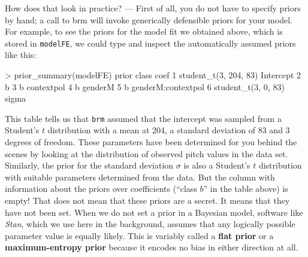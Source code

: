 \documentclass[nobib]{tufte-handout}
\begin{document}
How does that look in practice? --- First of all, you do not have to specify priors by hand; a call to \textrm{brm} will invoke generically defensible priors for your model. For example, to see the priors for the model fit we obtained above, which is stored in \texttt{modelFE}, we could type and inspect the automatically assumed priors like this:

\medskip

\begin{minipage}[]{\textwidth}
\begin{rc}
> prior_summary(modelFE)
                  prior     class               coef 
1 student_t(3, 204, 83) Intercept                    
2                               b                    
3                               b         contextpol 
4                               b            genderM 
5                               b genderM:contextpol 
6   student_t(3, 0, 83)     sigma  
\end{rc}
\end{minipage}

This table tells us that \texttt{brm} assumed that the intercept was sampled from a Student's $t$ distribution with a mean at 204, a standard deviation of 83 and 3 degrees of freedom. These parameters have been determined for you behind the scenes by looking at the distribution of observed pitch values in the data set.
%
%
Similarly, the prior for the standard deviation $\sigma$ is also a Student's $t$ distribution with suitable parameters determined from the data.
But the column with information about the priors over coefficients (``class $b$'' in the table above) is empty!
That does not mean that these priors are a secret.
It means that they have not been set.
When we do not set a prior in a Bayesian model, software like \emph{Stan}, which we use here in the background, assumes that any logically possible parameter value is equally likely.
This is variably called a \textbf{flat prior} or a \textbf{maximum-entropy prior} because it encodes no bias in either direction at all.
\end{document}
